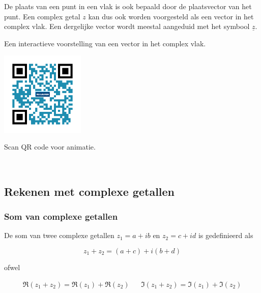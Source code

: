 De plaats van een punt in een vlak is ook bepaald door de plaatsvector van het punt. Een complex getal $z$ kan dus ook worden voorgesteld als een vector in het complex vlak. Een dergelijke vector wordt meestal aangeduid met het symbool $\underline{z}$.\\


Een interactieve voorstelling van een vector in het complex vlak.\\

\begin{minipage}{.25\linewidth}
	\raggedright
	\includegraphics[width=4cm]{3_gonio_complexe_getallen/inputs/QR_Code_ANIMATIE2_module3}
\end{minipage}
\begin{minipage}{.7\linewidth}
	Scan QR code voor animatie.
\end{minipage}  \\

\subsection{Rekenen met complexe getallen}

\subsubsection{Som van complexe getallen}

\begin{definitie}
De som van twee complexe getallen $z_{1}=a+ib$ en $z_{2}=c+id$ is gedefinieerd als\\

\begin{framed}
\[ z_{1}+z_{2}=(a+c)+i(b+d) \]
\end{framed}

ofwel

\begin{framed}
\[	
\begin{array}{ccc}
\Re(z_{1}+z_{2})=\Re(z_{1})+\Re(z_{2}) &  & \Im(z_{1}+z_{2})=\Im(z_{1})+\Im(z_{2}) 
\end{array} 
\]
\end{framed}
\end{definitie}


